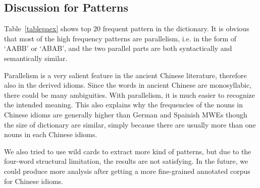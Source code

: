 \subsection{Discussion for Patterns}
Table~\ref{tablepaex} shows top 20 frequent pattern in the dictionary. It is obvious that most of the high frequency patterns are parallelism, i.e. in the form of `AABB' or `ABAB', and the two parallel parts are both syntactically and semantically similar.

Parallelism is a very salient feature in the ancient Chinese literature, therefore also in the derived idioms. Since the words in ancient Chinese are monosyllabic, there could be many ambiguities. With parallelism, it is much easier to recognize the intended meaning.
This also explains why the frequencies of the nouns in Chinese idioms are generally higher than German and Spainish MWEs though the size of dictionary are similar, simply because there are usually more than one nouns in each Chinese idioms.


We also tried to use wild cards to extract more kind of patterns, but due to the four-word structural limitation, the results are not satisfying. In the future, we could produce more analysis after getting a more fine-grained annotated corpus for Chinese idioms. 